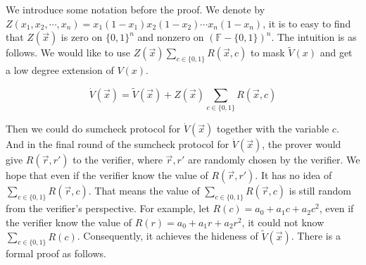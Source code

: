 We introduce some notation before the proof. We denote by $Z(x_1, x_2, \cdots, x_n) = x_1(1-x_1)x_2(1-x_2) \cdots x_n(1-x_n)$, it is to easy to find that $Z(\vec{x})$ is zero on $\{0, 1\}^n$ and nonzero on $(\mathbb{F} - \{0, 1\})^n$. The intuition is as follows. We would like to use $Z(\vec{x}) \sum\limits_{c \in \{0, 1\}}R(\vec{x}, c)$ to mask $\tilde{V}(x)$ and get a low degree extension of $V(x)$.

$$\dot{V}(\vec{x}) = \tilde{V}(\vec{x}) + Z(\vec{x})\sum\limits_{c \in \{0, 1\}} R(\vec{x}, c)$$

Then we could do sumcheck protocol for $\dot{V}(\vec{x})$ together with the variable $c$. And in the final round of the sumcheck protocol for $\dot{V}(\vec{x})$, the prover would give $R(\vec{r}, r')$ to the verifier, where $\vec{r}, r'$ are randomly chosen by the verifier. We hope that even if the verifier know the value of $R(\vec{r}, r')$. It has no idea of $\sum\limits_{c \in \{0, 1\}}R(\vec{r}, c)$. That means the value of $\sum\limits_{c \in \{0, 1\}}R(\vec{r}, c)$ is still random from the verifier's perspective. For example, let $R(c) = a_0 + a_1c + a_2c^2$, even if the verifier know the value of $R(r) = a_0 + a_1r + a_2r^2$, it could not know $\sum\limits_{c \in \{0, 1\}}R(c)$. Consequently, it achieves the hideness of $\tilde{V}(\vec{x})$. There is a formal proof as follows.

